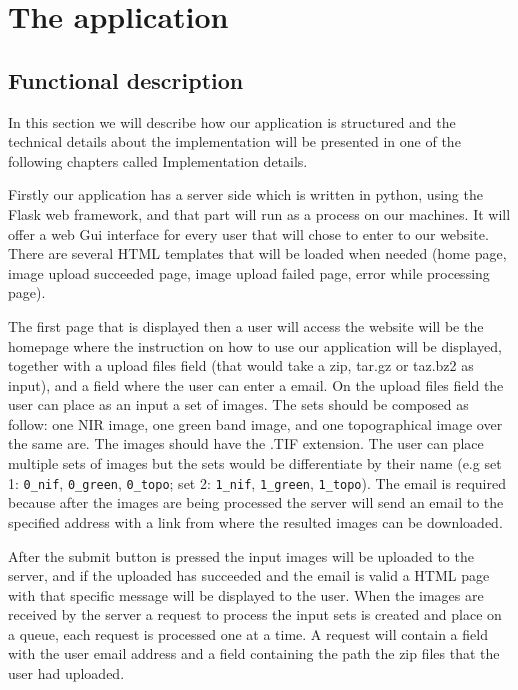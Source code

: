 \documentclass[12pt, a4paper]{report}
\begin{document}
\chapter{The application}

\section{Functional description}

\quad 
In this section we will describe how our application is structured and the technical details about the implementation will be presented in one of the following chapters called Implementation details. 
\par 

Firstly our application has a server side which is written in python, using the Flask web framework, and that part will run as a process on our machines. It will offer a web Gui interface for every user that will chose to enter to our website. There are several HTML templates that will be loaded when needed (home page, image upload succeeded page, image upload failed page, error while processing page). 
\par 

The first page that is displayed then a user will access the website will be the homepage where the instruction on how to use our application will be displayed, together with a upload files field (that would take a zip, tar.gz or taz.bz2 as input), and a field where the user can enter a email. On the upload files field the user can place as an input a set of images. The sets should be composed as follow: one NIR image, one green band image, and one topographical image over the same are. The images should have the .TIF extension. The user can place multiple sets of images but the sets would be differentiate by their name (e.g set 1: \texttt{0\_nif}, \texttt{0\_green}, \texttt{0\_topo}; set 2: \texttt{1\_nif}, \texttt{1\_green}, \texttt{1\_topo}). The email is required because after the images are being processed the server will send an email to the specified address with a link from where the resulted images can be downloaded.
\par 

After the submit button is pressed the input images will be uploaded to the server, and if the uploaded has succeeded and the email is valid a HTML page with that specific message will be displayed to the user. When the images are received by the server a request to process the input sets is created and place on a queue, each request is processed one at a time. A request will contain a field with the user email address and a field containing the path the zip files that the user had uploaded.
\par 
\end{document}
